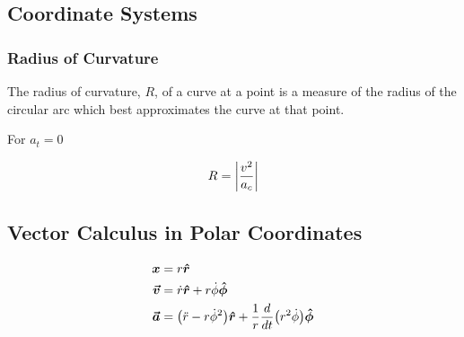 \subsection{Coordinate Systems} 

\subsubsection{Radius of Curvature}

The radius of curvature, $R$, of a curve at a point is a measure of the radius of the circular arc which best approximates the curve at that point.

For $a_t = 0$

\[
R= \abs{\frac{v^2}{a_c}}
\]

\subsection{Vector Calculus in Polar Coordinates}

\begin{align*}
\boldsymbol{x}& = r \boldsymbol{\hat{r}}\\
\boldsymbol{\vec{v}}& = \dot{r} \boldsymbol{\hat{r}} + r \dot{\phi} \boldsymbol{\hat{\phi}}\\
\label{eq:a_vec_def}\boldsymbol{\vec{a}}& = \paren{\ddot{r} - r \dot{\phi}^2} \boldsymbol{\hat{r}} + \frac{1}{r} \frac{d}{dt} \paren{r^2 \dot{\phi}} \boldsymbol{\hat{\phi}}
\end{align*}